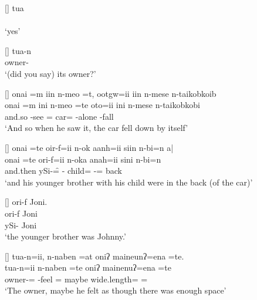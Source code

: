 \begin{exe}
\vspace{-4pt}
[]{\gll
	tua \\
	{\tua} \\
\glt `yes'}

[]{\gll
	tua-n \\
	owner-{\N} \\
\glt `(did you say) its owner?'}

[]{\glll
	{onai =m} iin n-meo =t, ootgw=ii iin n-mese n-taikob{\tl}koib \\
	{onai =m} ini n-meo =te oto=ii ini n-mese n-taikob{\tl}kobi \\
	and.so {\iin} \n-see ={\te} car={\ii} {\iin} \n-alone \n-{\prd}fall \\
\glt `And so when he saw it, the car fell down by itself'}

\newpage
{}
[]{\glll
	{onai =te} oir-f=ii n-ok aanh=ii siin n-bi=n a| \\
	{onai =te} ori-f=ii n-oka anah=ii sini n-bi=n {\a} \\
	and.then ySi-\f={\ii} {\n-\ok} child={\ii} {\siin} \n-\bi={\einV} {\a}back \\
\glt `and his younger brother with his child were in the back (of the car)'}

[]{\glll
	ori-f Joni. \\
	ori-f Joni \\
	ySi-{\F} Joni \\
\glt `the younger brother was Johnny.' }

[]{\glll
	tua-n=ii, n-naben =at oniʔ maineunʔ=ena =te. \\
	tua-n=ii n-naben =te oniʔ mainenuʔ=ena =te \\
	owner-{\N}={\ii} \n-feel ={\te} maybe wide.length={\een} ={\te} \\
\glt `The owner, maybe he felt as though there was enough space'}

\end{exe}
